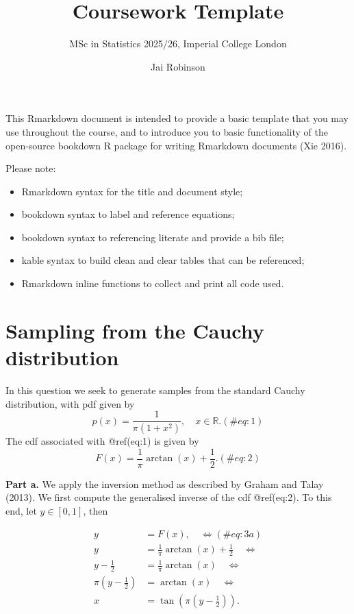 \documentclass[
  letterpaper,
  DIV=11,
  numbers=noendperiod]{scrartcl}
\title{Coursework Template}
\subtitle{MSc in Statistics 2025/26, Imperial College London}
\author{Jai Robinson}
\date{}
\providecommand{\tightlist}{%
  \setlength{\itemsep}{0pt}\setlength{\parskip}{0pt}}
\begin{document}
\maketitle


This Rmarkdown document is intended to provide a basic template that you
may use throughout the course, and to introduce you to basic
functionality of the open-source bookdown R package for writing
Rmarkdown documents (Xie 2016).

Please note:

\begin{itemize}
\tightlist
\item
  Rmarkdown syntax for the title and document style;
\item
  bookdown syntax to label and reference equations;
\item
  bookdown syntax to referencing literate and provide a bib file;
\item
  kable syntax to build clean and clear tables that can be referenced;
\item
  Rmarkdown inline functions to collect and print all code used.
\end{itemize}

\section{Sampling from the Cauchy
distribution}\label{sampling-from-the-cauchy-distribution}

In this question we seek to generate samples from the standard Cauchy
distribution, with pdf given by \begin{equation}
  p(x) = \frac{1}{\pi (1 + x^2)}, \quad x \in \mathbb{R}.
  (\#eq:1)
\end{equation} The cdf associated with @ref(eq:1) is given by
\begin{equation}
  F(x) = \frac{1}{\pi}\arctan(x) + \frac{1}{2}.
  (\#eq:2)
\end{equation}

\textbf{Part a.} We apply the inversion method as described by Graham
and Talay (2013). We first compute the generalised inverse of the cdf
@ref(eq:2). To this end, let \(y\in [0,1]\), then

\begin{align}
    y &= F(x), \quad \iff (\#eq:3a) \\
    y &= \frac{1}{\pi}\arctan(x) + \frac{1}{2} \quad \iff \\
    y-\frac{1}{2}  &= \frac{1}{\pi}\arctan(x)  \quad \iff \\
    \pi\left(y-\frac{1}{2}\right)  &= \arctan(x)  \quad \iff \\
    x &= \tan\left(\pi\left(y-\frac{1}{2}\right)\right). 
\end{align}
\end{document}
